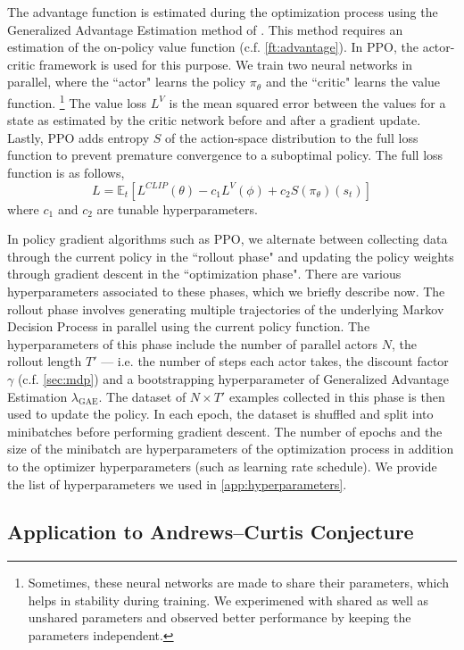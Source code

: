 The advantage function is estimated during the optimization process using the Generalized Advantage Estimation method of
\cite{schulman2018highdimensional}.
This method requires an estimation of the on-policy value function (c.f. \autoref{ft:advantage}). In PPO, the actor-critic framework is used for this purpose. We train two neural networks in parallel, where the ``actor" learns the policy $\pi_\theta$ and the ``critic" learns the value function.
\footnote{
Sometimes, these neural networks are made to share their parameters, which helps in stability during training. We experimened with shared as well as unshared parameters and observed better performance by keeping the parameters independent.
}
The value loss $L^V$ is the mean squared error between the values for a state as estimated by the critic network before and after a gradient update.
Lastly, PPO adds entropy $S$ of the action-space distribution to the full loss function to prevent premature convergence to a suboptimal policy. The full loss function is as follows,
\[
L = \mathbb{E}_{t} [L^{CLIP}(\theta) - c_1 L^{V}(\phi) + c_2 S(\pi_\theta)(s_t)]
\]
where $c_1$ and $c_2$ are tunable hyperparameters.
\newline

In policy gradient algorithms such as PPO, we alternate between collecting data through the current policy in the ``rollout phase" and updating the policy weights through gradient descent in the ``optimization phase". There are various hyperparameters associated to these phases, which we briefly describe now. The rollout phase involves generating multiple trajectories of the underlying Markov Decision Process in parallel using the current policy function. The hyperparameters of this phase include the number of parallel actors $N$, the rollout length $T'$ --- i.e. the number of steps each actor takes, the discount factor $\gamma$ (c.f. \autoref{sec:mdp}) and a bootstrapping hyperparameter of Generalized Advantage Estimation $\lambda_{\text{GAE}}$. The dataset of $N \times T'$ examples collected in this phase is then used to update the policy. In each epoch, the dataset is shuffled and split into minibatches before performing gradient descent. The number of epochs and the size of the minibatch are hyperparameters of the optimization process in addition to the optimizer hyperparameters (such as learning rate schedule). We provide the list of hyperparameters we used in  \autoref{app:hyperparameters}.


\subsection{Application to Andrews--Curtis Conjecture} \label{sec:application}

